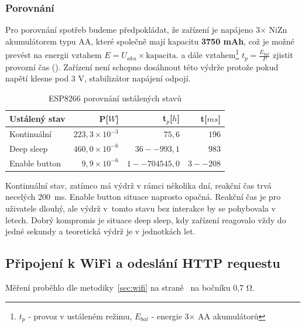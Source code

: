 \documentclass[a4paper, 12pt]{report}
\begin{document}
    \subsubsection{Porovnání}
    Pro porovnání spotřeb budeme předpokládat, že zařízení je napájeno 3$\times$ NiZn akumulátorem typu AA, které společně mají kapacitu \textbf{3750 mAh}, což je možné prevést na energii vztahem $E = U_{aku}\times \textrm{kapacita}$.
    a dále vztahem\footnote{$ t_{p}$ - provoz v ustáleném režimu, $ E_{bat}$ - energie 3$\times$ AA akumulátorů} $ t_{p} = \frac{E_{bat}}{P}$ zjistit provozní čas (). Zařízení není schopno dosáhnout této výdrže protože pokud napětí klesne pod 3 V, stabilizátor napájení odpojí.

    \begin{table}[h!]
        \centering
        \caption{ESP8266 porovnání ustálených stavů}
        \begin{tabular}{||l|r r r||}
            \hline
            Ustálený stav & P[$W$]                 & t$_{p}$[$h$]   & t[$ms$]  \\
            \hline
            Kontinuální   & $223,3 \times 10^{-3}$ & $75,6$         & $196$    \\
            Deep sleep    & $460,0 \times 10^{-6}$ & $36--993,1$    & $983$    \\
            Enable button & $9,9\times 10^{-6}$    & $1--704 545,0$ & $3--208$ \\
            \hline
        \end{tabular}
        \label{tab:esp8266-klidove-rezimy-porovnani}
    \end{table}
    Kontinuální stav, zatímco má výdrž v rámci několika dní, reakční čas trvá necelých 200~ms. Enable button situace naprosto opačná. Reakční čas je pro uživatele dlouhý, ale výdrž v~tomto stavu bez interakce by se pohybovala v letech. Dobrý kompromis je situace deep sleep, kdy zařízení reagovalo vždy do jedné sekundy a teoretická výdrž je v jednotkách let.\\

    \subsection{Připojení k WiFi a odeslání HTTP requestu}
    Měření proběhlo dle metodiky~\ref{sec:wifi} na straně~\pageref{sec:wifi} na bočníku 0,7 \si{\ohm}.
\end{document}
